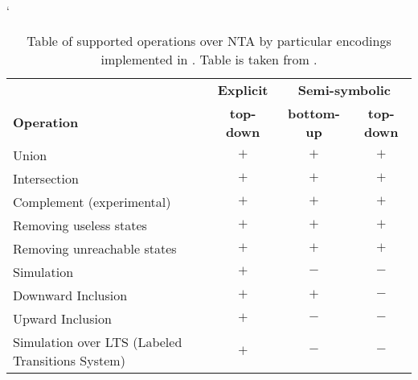 \begin{table}[bt]
	\begin{center}
		\catcode`
		\begin{tabular}{| l | c | c | c |} \hline
		& {\textbf{Explicit}} & \multicolumn{2}{|c|}{\textbf{Semi-symbolic}} \\ \cline{2-4}
		\textbf{Operation} & \textbf{top-down} & \textbf{bottom-up} & \textbf{top-down} \\ \hline
		Union & $+$ & $+$ & $+$ \\
		Intersection & $+$ & $+$ & $+$ \\
		Complement (experimental) & $+$ & $+$ & $+$ \\
		Removing useless states & $+$ & $+$ & $+$ \\
		Removing unreachable states & $+$ & $+$ & $+$ \\
		Simulation & $+$ & $-$ & $-$ \\
		Downward Inclusion  & $+$ & $+$ & $-$ \\ 
		Upward Inclusion  & $+$ & $-$ & $-$ \\ 
		Simulation over LTS (Labeled Transitions System) & $+$ & $-$ & $-$ \\ \hline
		\end{tabular}
	\caption{Table of supported operations over NTA by particular encodings implemented in \vata.
	Table is taken from \cite{hruska13}.}
	\label{tab:vataop}
	\end{center}
\end{table}
